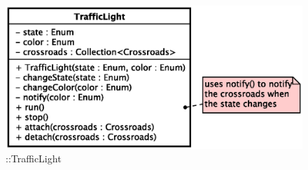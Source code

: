\begin{figure}[h]
\centering
\includegraphics[scale=0.6,keepaspectratio]{images/solution/traffic_light.eps}
\caption{\pActive::TrafficLight}
\label{fig:sd-app-traffic-light}
\end{figure}
\FloatBarrier
